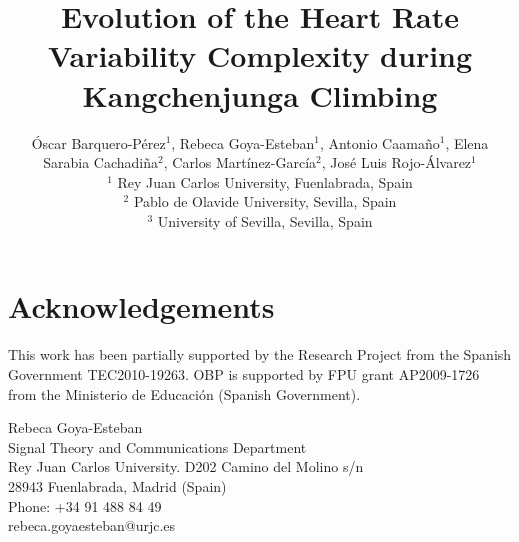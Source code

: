 \documentclass[twocolumn]{cinc}
\begin{document}


\title{Evolution of the Heart Rate Variability Complexity during Kangchenjunga Climbing}

\author {\'Oscar Barquero-P\'erez$^1$, Rebeca Goya-Esteban$^1$, Antonio Caama\~no$^1$, Elena Sarabia Cachadi\~na$^2$, Carlos Mart\'inez-Garc\'ia$^2$, Jos\'e Luis Rojo-\'Alvarez$^1$\\
 $^1$ Rey Juan Carlos University, Fuenlabrada, Spain\\
 $^2$ Pablo de Olavide University, Sevilla, Spain\\
$^3$ University of Sevilla, Sevilla, Spain}

\maketitle
















\balance

\section*{Acknowledgements}  
This work has been partially supported by the Research Project from the Spanish Government TEC2010-19263.
OBP is supported by FPU grant AP2009-1726 from the Ministerio de Educaci\'on (Spanish Government).





\begin{correspondence}
Rebeca Goya-Esteban\\
Signal Theory and Communications Department\\
Rey Juan Carlos University. D202 Camino del Molino s/n\\
28943 Fuenlabrada, Madrid (Spain)\\
Phone: +34 91 488 84 49\\
rebeca.goyaesteban@urjc.es
\end{correspondence}
\end{document}

